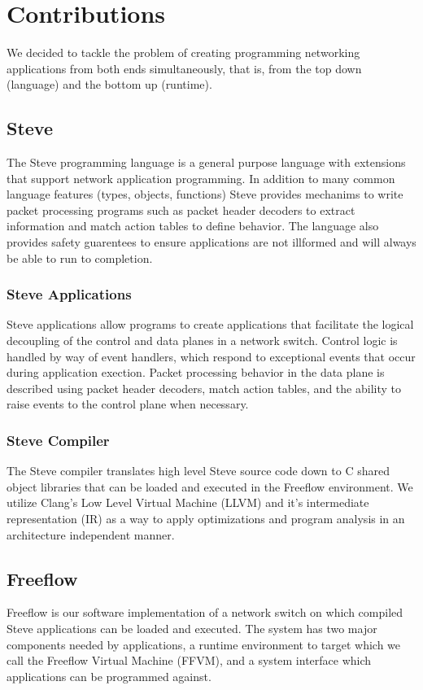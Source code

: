 \section{Contributions}
We decided to tackle the problem of creating programming networking applications from both ends simultaneously, that is, from the top down 
(language) and the bottom up (runtime). 

\subsection{Steve}
The Steve programming language is a general purpose language with
extensions that support network application programming. In addition to
many common language features (types, objects, functions) Steve provides
mechanims to write packet processing programs such as packet header decoders to
extract information and match action tables to define behavior. The language 
also provides safety guarentees to ensure applications are not illformed and
will always be able to run to completion.

\subsubsection{Steve Applications}
Steve applications allow programs to create applications that facilitate the 
logical decoupling of the control and data planes in a network switch. Control 
logic is handled by way of event handlers, which respond to exceptional events 
that occur during application exection. Packet processing behavior in the data 
plane is described using packet header decoders, match action tables, and the 
ability to raise events to the control plane when necessary.

\subsubsection{Steve Compiler}
The Steve compiler translates high level Steve source code down to C shared object libraries that can be loaded and executed in the Freeflow environment. We utilize Clang's Low Level Virtual Machine (LLVM) and it's intermediate representation (IR) as a way to apply optimizations and program analysis in an architecture independent manner. 

\subsection{Freeflow}
Freeflow is our software implementation of a network switch on which compiled
Steve applications can be loaded and executed. The system has two major components needed by applications, a runtime environment to target which we
call the Freeflow Virtual Machine (FFVM), and a system interface which
applications can be programmed against. 

